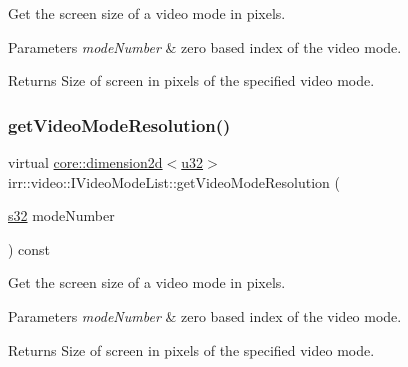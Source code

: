 Get the screen size of a video mode in pixels. 


\begin{DoxyParams}{Parameters}
{\em mode\+Number} & zero based index of the video mode. \\
\hline
\end{DoxyParams}
\begin{DoxyReturn}{Returns}
Size of screen in pixels of the specified video mode. 
\end{DoxyReturn}
\mbox{\label{classirr_1_1video_1_1IVideoModeList_af8409c756780c3566c94596cf7f94fc3}} 
\subsubsection{\texorpdfstring{get\+Video\+Mode\+Resolution()}{getVideoModeResolution()}\hspace{0.1cm}{\footnotesize\ttfamily [2/4]}}
{\footnotesize\ttfamily virtual \hyperlink{classirr_1_1core_1_1dimension2d}{core\+::dimension2d}$<$\hyperlink{namespaceirr_a0416a53257075833e7002efd0a18e804}{u32}$>$ irr\+::video\+::\+I\+Video\+Mode\+List\+::get\+Video\+Mode\+Resolution (\begin{DoxyParamCaption}\item[{\hyperlink{namespaceirr_ac66849b7a6ed16e30ebede579f9b47c6}{s32}}]{mode\+Number }\end{DoxyParamCaption}) const\hspace{0.3cm}{\ttfamily [pure virtual]}}



Get the screen size of a video mode in pixels. 


\begin{DoxyParams}{Parameters}
{\em mode\+Number} & zero based index of the video mode. \\
\hline
\end{DoxyParams}
\begin{DoxyReturn}{Returns}
Size of screen in pixels of the specified video mode. 
\end{DoxyReturn}
\mbox{\label{classirr_1_1video_1_1IVideoModeList_aa06b5905ac9c04fb38a17bf798fccc9b}} 
